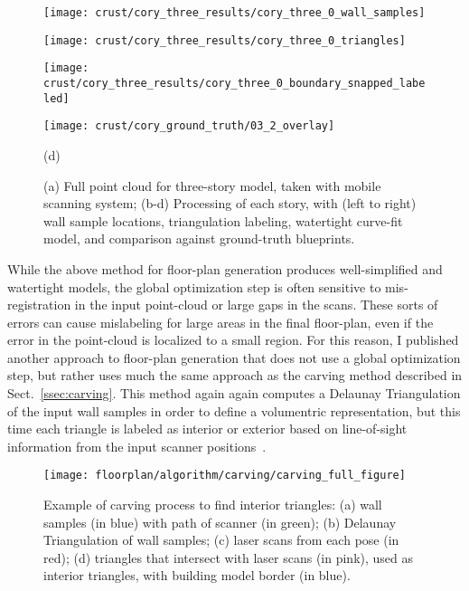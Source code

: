 \documentclass[journal]{IEEEtran}
\begin{document}
\begin{figure*}[t]
\begin{minipage}[b]{0.24\linewidth}
  \centering
  \centerline{\texttt{[image: crust/cory\_three\_results/cory\_three\_0\_wall\_samples]}}
\end{minipage}
\hfill
\begin{minipage}[b]{0.24\linewidth}
  \centering
  \centerline{\texttt{[image: crust/cory\_three\_results/cory\_three\_0\_triangles]}}
\end{minipage}
\hfill
\begin{minipage}[b]{0.24\linewidth}
  \centering
  \centerline{\texttt{[image: crust/cory\_three\_results/cory\_three\_0\_boundary\_snapped\_labeled]}}
\end{minipage}
\hfill
\begin{minipage}[b]{0.24\linewidth}
  \centering
  \centerline{\texttt{[image: crust/cory\_ground\_truth/03\_2\_overlay]}}
\end{minipage}
\centerline{(d)}
\linebreak

\caption{(a) Full point cloud for three-story model, taken with mobile scanning system; (b-d) Processing of each story, with (left to right) wall sample locations, triangulation labeling, watertight curve-fit model, and comparison against ground-truth blueprints.}
\label{fig:cory_three_results}

\end{figure*}


While the above method for floor-plan generation produces well-simplified and watertight models, the global optimization step is often sensitive to mis-registration in the input point-cloud or large gaps in the scans.  These sorts of errors can cause mislabeling for large areas in the final floor-plan, even if the error in the point-cloud is localized to a small region.  For this reason, I published another approach to floor-plan generation that does not use a global optimization step, but rather uses much the same approach as the carving method described in Sect.~\ref{ssec:carving}.  This method again again computes a Delaunay Triangulation of the input wall samples in order to define a volumentric representation, but this time each triangle is labeled as interior or exterior based on line-of-sight information from the input scanner positions~\cite{Turner14}.

\begin{figure}[t]
  \centering
  \texttt{[image: floorplan/algorithm/carving/carving\_full\_figure]}
  \caption{Example of carving process to find interior triangles:  (a) wall samples (in blue) with path of scanner (in green); (b) Delaunay Triangulation of wall samples; (c) laser scans from each pose (in red); (d) triangles that intersect with laser scans (in pink), used as interior triangles, with building model border (in blue).}
  \label{fig:floorplan_creation}
\end{figure}
\end{document}
